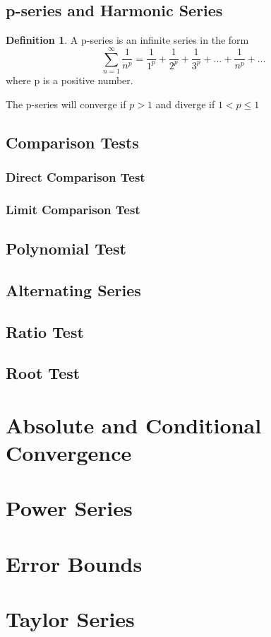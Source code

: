 \documentclass[letterpaper]{report}
\theoremstyle{definition}
\newtheorem{definition}{Definition}
\begin{document}
\subsection{p-series and Harmonic Series}
\begin{definition}
A p-series is an infinite series in the form
\[ \sum_{n=1}^\infty \frac{1}{n^p}=\frac{1}{1^p}+\frac{1}{2^p}
    +\frac{1}{3^p}+...+\frac{1}{n^p}+... \]
where p is a positive number.
\end{definition}
The p-series will converge if $p>1$ and diverge if $1<p\leq1$
\subsection{Comparison Tests}
\subsubsection{Direct Comparison Test}
\subsubsection{Limit Comparison Test}
\subsection{Polynomial Test}
\subsection{Alternating Series}
\subsection{Ratio Test}
\subsection{Root Test}
\section{Absolute and Conditional Convergence}
\section{Power Series}
\section{Error Bounds}
\section{Taylor Series}
\end{document}
